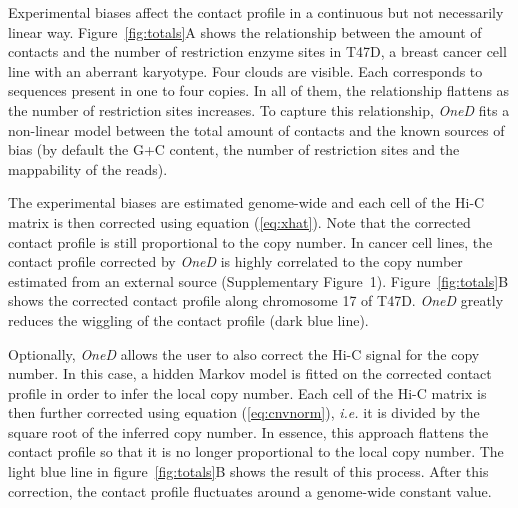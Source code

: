 \documentclass[a4,center,fleqn]{NAR}
\providecommand{\DIFadd}[1]{{\protect\color{red}#1}} %
\providecommand{\DIFdel}[1]{{\protect}}                      %
\providecommand{\DIFaddbegin}{} %
\providecommand{\DIFaddend}{} %
\providecommand{\DIFdelbegin}{} %
\providecommand{\DIFdelend}{} %
\begin{document}
Experimental biases affect the \DIFdelbegin \DIFdel{total amount of contacts }\DIFdelend \DIFaddbegin \DIFadd{contact profile }\DIFaddend in a continuous but not
necessarily linear way. Figure~\ref{fig:totals}A shows the relationship
between the amount of contacts and the number of restriction enzyme sites
in T47D, a breast cancer cell line with an aberrant karyotype.  Four
clouds are visible. Each corresponds to sequences present in one to four
copies. In all of them, the relationship flattens as the number of
restriction sites increases. To capture this relationship, \textit{OneD}
fits a non-linear model between the total amount of contacts and the known
sources of bias (by default the G+C content, the number of restriction
sites and the mappability of the reads).

The experimental biases are estimated genome-wide and each cell of the
\DIFaddbegin \DIFadd{Hi-C }\DIFaddend matrix is then corrected using equation (\ref{eq:xhat}). Note that
the corrected \DIFdelbegin \DIFdel{amount of contacts }\DIFdelend \DIFaddbegin \DIFadd{contact profile }\DIFaddend is still proportional to the copy number.
\DIFdelbegin \DIFdel{Figure~}\DIFdelend \DIFaddbegin \DIFadd{In cancer cell lines, the contact profile corrected by }\textit{\DIFadd{OneD}} \DIFadd{is
highly correlated to the copy number estimated from an external source
(Supplementary Figure~1). Figure~}\DIFaddend \ref{fig:totals}B shows the corrected
\DIFdelbegin \DIFdel{number of contacts }\DIFdelend \DIFaddbegin \DIFadd{contact profile }\DIFaddend along chromosome 17 of T47D. \textit{OneD} greatly reduces
the wiggling of the \DIFdelbegin \DIFdel{total amount of contacts (}\DIFdelend \DIFaddbegin \DIFadd{contact profile (dark }\DIFaddend blue line).

\DIFaddbegin \DIFadd{Optionally, }\textit{\DIFadd{OneD}} \DIFadd{allows the user to also correct the Hi-C signal
for the copy number. In this case, a hidden Markov model is fitted on the
corrected contact profile in order to infer the local copy number. Each
cell of the Hi-C matrix is then further corrected using equation
(\ref{eq:cnvnorm}), }\textit{\DIFadd{i.e.}} \DIFadd{it is divided by the square root of the
inferred copy number. In essence, this approach flattens the contact
profile so that it is no longer proportional to the local copy number. The
light blue line in figure~\ref{fig:totals}B shows the result of this
process. After this correction, the contact profile fluctuates around a
genome-wide constant value.
}\DIFaddend 
\end{document}
